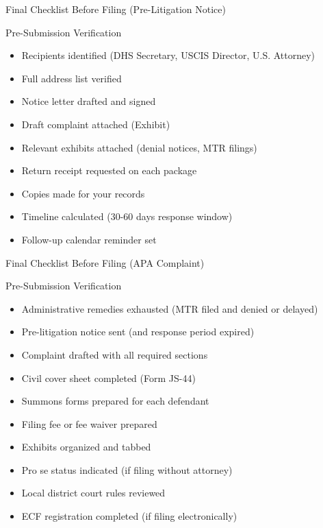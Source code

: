 \documentclass[11pt]{beamer}
\begin{document}
	\begin{frame}{Final Checklist Before Filing (Pre-Litigation Notice)}
		\scriptsize
		\begin{block}{Pre-Submission Verification}
			\begin{itemize}
				\item [$\square$] Recipients identified (DHS Secretary, USCIS Director, U.S. Attorney)
				\item [$\square$] Full address list verified
				\item [$\square$] Notice letter drafted and signed
				\item [$\square$] Draft complaint attached (Exhibit)
				\item [$\square$] Relevant exhibits attached (denial notices, MTR filings)
				\item [$\square$] Return receipt requested on each package
				\item [$\square$] Copies made for your records
				\item [$\square$] Timeline calculated (30-60 days response window)
				\item [$\square$] Follow-up calendar reminder set
			\end{itemize}
		\end{block}
	\end{frame}
	
	\begin{frame}{Final Checklist Before Filing (APA Complaint)}
		\scriptsize
		\begin{block}{Pre-Submission Verification}
			\begin{itemize}
				\item [$\square$] Administrative remedies exhausted (MTR filed and denied or delayed)
				\item [$\square$] Pre-litigation notice sent (and response period expired)
				\item [$\square$] Complaint drafted with all required sections
				\item [$\square$] Civil cover sheet completed (Form JS-44)
				\item [$\square$] Summons forms prepared for each defendant
				\item [$\square$] Filing fee or fee waiver prepared
				\item [$\square$] Exhibits organized and tabbed
				\item [$\square$] Pro se status indicated (if filing without attorney)
				\item [$\square$] Local district court rules reviewed
				\item [$\square$] ECF registration completed (if filing electronically)
			\end{itemize}
		\end{block}
	\end{frame}
	
\end{document}
